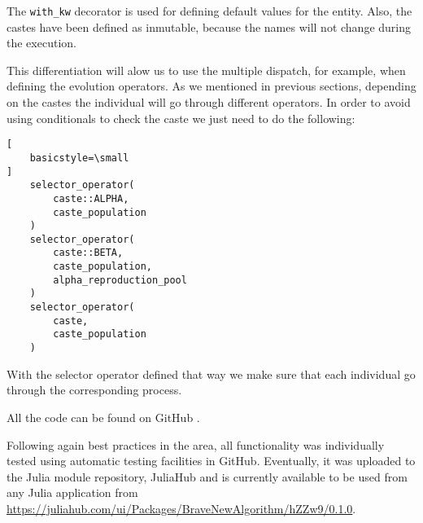 The \lstinline{with_kw} decorator is used for defining default values for the entity. Also, the castes have been defined as inmutable,
because the names will not change during the execution.

This differentiation will alow us to use the multiple dispatch, for example,
when defining the evolution operators. As we mentioned in previous sections,
depending on the castes the individual will go through different operators. In
order to avoid using conditionals to check the caste we just need to do the
following:

\begin{lstlisting}[
    basicstyle=\small
]
    selector_operator(
        caste::ALPHA, 
        caste_population
    )
    selector_operator(
        caste::BETA, 
        caste_population, 
        alpha_reproduction_pool
    )
    selector_operator(
        caste, 
        caste_population
    )
\end{lstlisting}

With the selector operator defined that way we make sure that each individual go through the corresponding process.

All the code can be found on GitHub \cite{project_repository}.


Following again best practices in the area, all functionality was individually
tested using automatic testing facilities in GitHub. Eventually, it was uploaded
to the Julia module repository, JuliaHub and is currently available to be used
from any Julia application from
\url{https://juliahub.com/ui/Packages/BraveNewAlgorithm/hZZw9/0.1.0}.
